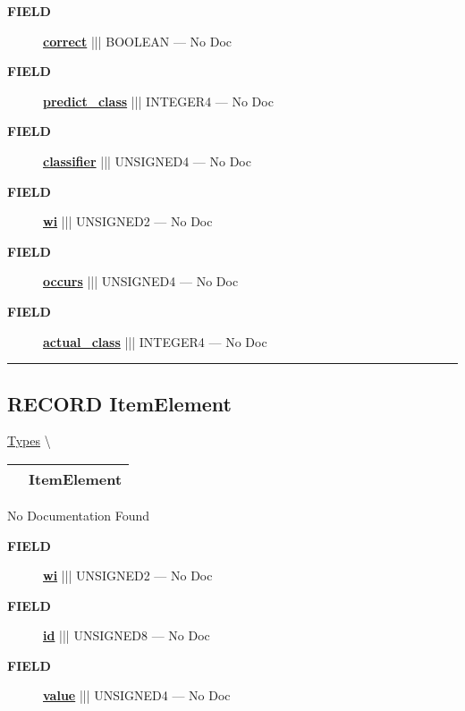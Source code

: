 \par
\begin{description}
\item [\colorbox{tagtype}{\color{white} \textbf{\textsf{FIELD}}}] \textbf{\underline{correct}} ||| BOOLEAN --- No Doc
\item [\colorbox{tagtype}{\color{white} \textbf{\textsf{FIELD}}}] \textbf{\underline{predict\_class}} ||| INTEGER4 --- No Doc
\item [\colorbox{tagtype}{\color{white} \textbf{\textsf{FIELD}}}] \textbf{\underline{classifier}} ||| UNSIGNED4 --- No Doc
\item [\colorbox{tagtype}{\color{white} \textbf{\textsf{FIELD}}}] \textbf{\underline{wi}} ||| UNSIGNED2 --- No Doc
\item [\colorbox{tagtype}{\color{white} \textbf{\textsf{FIELD}}}] \textbf{\underline{occurs}} ||| UNSIGNED4 --- No Doc
\item [\colorbox{tagtype}{\color{white} \textbf{\textsf{FIELD}}}] \textbf{\underline{actual\_class}} ||| INTEGER4 --- No Doc
\end{description}





\rule{\linewidth}{0.5pt}
\subsection*{\textsf{\colorbox{headtoc}{\color{white} RECORD}
ItemElement}}

\hypertarget{ecldoc:ml_core.types.itemelement}{}
\hspace{0pt} \hyperlink{ecldoc:ML_Core.Types}{Types} \textbackslash 

{\renewcommand{\arraystretch}{1.5}
\begin{tabularx}{\textwidth}{|>{\raggedright\arraybackslash}l|X|}
\hline
\hspace{0pt}\mytexttt{\color{red} } & \textbf{ItemElement} \\
\hline
\end{tabularx}
}

\par





No Documentation Found







\par
\begin{description}
\item [\colorbox{tagtype}{\color{white} \textbf{\textsf{FIELD}}}] \textbf{\underline{wi}} ||| UNSIGNED2 --- No Doc
\item [\colorbox{tagtype}{\color{white} \textbf{\textsf{FIELD}}}] \textbf{\underline{id}} ||| UNSIGNED8 --- No Doc
\item [\colorbox{tagtype}{\color{white} \textbf{\textsf{FIELD}}}] \textbf{\underline{value}} ||| UNSIGNED4 --- No Doc
\end{description}





